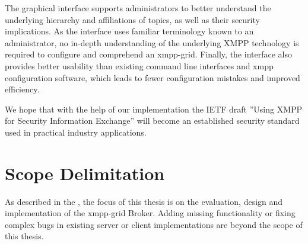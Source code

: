 The graphical interface supports administrators to better understand the underlying hierarchy and affiliations of \glspl{topic}, as well as their security implications.
As the interface uses familiar terminology known to an administrator, no in-depth understanding of the underlying XMPP technology is required to configure and comprehend an \gls{xmpp-grid}.
Finally, the interface also provides better usability than existing command line interfaces and \gls{xmpp} configuration software, which leads to fewer configuration mistakes and improved efficiency.

We hope that with the help of our implementation the IETF draft ''Using XMPP for Security Information Exchange'' will become an established security standard used in practical industry applications.

\section{Scope Delimitation} %
As described in the , the focus of this thesis is on the evaluation, design and implementation of the \gls{xmpp-grid} Broker.
Adding missing functionality or fixing complex bugs in existing server or client implementations are beyond the scope of this thesis.
